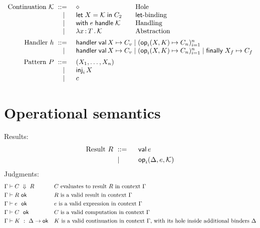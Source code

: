 \documentclass{article}
\newcommand{\C}{C}     %
\newcommand{\K}{K}     %
\newcommand{\X}{X}     %
\newcommand{\rgn}{r}   %
\newcommand{\h}{h}     %
\newcommand{\KK}{{\cal K}} %
\newcommand{\val}{\mathsf{val}\,} %
\newcommand{\letin}[1]{\mathsf{let}\; #1 \;\mathsf{in}\;} %
\newcommand{\opPat}[3][i]{\mathsf{op}_{#1}(#2, #3)} %
\newcommand{\opRes}[4][i]{\mathsf{op}_{#1}(#2, #3, #4)} %
\newcommand{\withhandle}[1]{\mathsf{with}\;#1\;\mathsf{handle}\;} %
\newcommand{\abs}[1]{\mathsf{abs}\;#1\;\mathsf{in}\;} %
\newcommand{\ttlam}[2]{\lambda #1 \,{:}\, #2 \,.\,} %
\newcommand{\handler}[6][n]{\mathsf{handler}\; \val #2 \mapsto #3 \mid (\opPat{#4}{#5} \mapsto #6_{#1})_{i=1}^{#1}}
\newcommand{\fhandler}[8][n]{\mathsf{handler}\; \val #2 \mapsto #3 \mid (\opPat{#4}{#5} \mapsto #6_{#1})_{i=1}^{#1} \mid \mathsf{finally}\; #7\mapsto #8}
\newcommand{\hole}{\diamond}
\newcommand{\tuple}[1]{(#1)}
\newcommand{\pat}{P}
\renewcommand{\c}{c} %
\newcommand{\inj}[2][i]{\mathsf{inj}_{#1}\, #2}
\newcommand{\evalto}[3][\G]{#1 \vdash #2 \ \Downarrow\  #3}
\newcommand{\resultok}[2][\G]{#1 \vdash #2 \ \mathsf{ok}}
\newcommand{\eok}[2][\G]{#1 \vdash #2 \ \ \mathsf{ok}}
\newcommand{\cok}[2][\G]{#1 \vdash #2 \ \ \mathsf{ok}}
\newcommand{\kok}[3][\G]{#1 \vdash #3 \ : \ #2\to\mathsf{ok}}
\newcommand{\typicalhandler}{\handler{\X}{\C_v}{\X}{\K}{\C}}
\newcommand{\finallyhandler}{\fhandler{\X}{\C_v}{\X}{\K}{\C}{\X_f}{\C_f}}
\begin{document}
\begin{equation*}
\begin{array}{rl@{\qquad}l}
    \text{Continuation $\KK$} \bnf    & \hole                & \text{Hole} \\
    \bnfor  & \letin{\X = \KK} \C_2  & \text{$\mathsf{let}$-binding} \\
    \bnfor  & \withhandle{\e} \KK & \text{Handling} \\
    \bnfor  & \ttlam{\x}{\T}{\KK} & \text{Abstraction} \\[5pt]

  \text{Handler $\h$}
  \bnf & \multicolumn{2}{l}{\typicalhandler}\\
  \bnfor & \multicolumn{2}{l}{\finallyhandler}\\[5pt]

  \text{Pattern $\pat$}
  \bnf & \tuple{\X_1,\ldots,\X_n}\\
  \bnfor & \inj{\X}\\
  \bnfor & \c\\
\end{array}
\end{equation*}



\section{Operational semantics}
\label{sec:oper-semant}

Results:
%
\begin{equation*}
  \text{Result $R$}
  \begin{aligned}[t]
    &\bnf   {} && \val \e \\
    &\bnfor {} && \opRes{\D}{\e}{\KK} \\
  \end{aligned}
\end{equation*}
%
Judgments:
%
\begin{align*}
  &\evalto[\G]{C}{R} &&\text{$C$ evaluates to result $R$ in context $\G$} \\
  &\resultok[\G]{R}  &&\text{$R$ is a valid result in context $\G$} \\
  &\eok[\G]{\e} &&\text{$\e$ is a valid expression in context $\G$} \\
  &\cok[\G]{\C} &&\text{$\C$ is a valid computation in context $\G$} \\
  &\kok[\G]{\D}{\K} &&\text{$\K$ is a valid continuation in context $\G$,
                              with its hole inside additional binders $\D$} \\
\end{align*}
%
\end{document}

